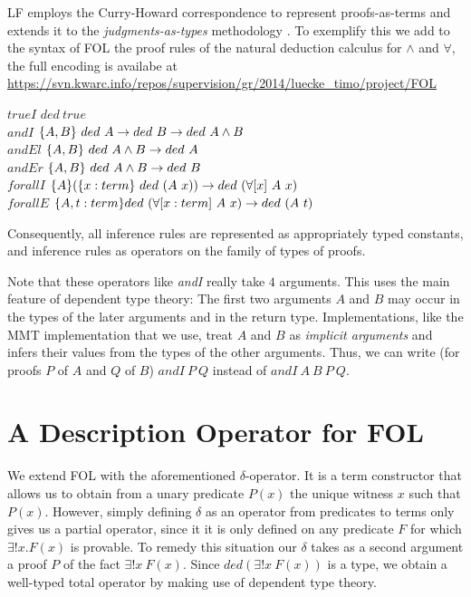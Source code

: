 \documentclass{article}
\begin{document}
LF employs the Curry-Howard correspondence to represent proofs-as-terms \cite{curryhoward} and extends it to the  \emph{judgments-as-types} methodology \cite{martinlof}. 
To exemplify this we add to the syntax of FOL the proof rules of the natural deduction calculus for $\wedge$ and $\forall$, the full encoding is availabe at \url{https://svn.kwarc.info/repos/supervision/gr/2014/luecke_timo/project/FOL}%
\begin{twelfsig}
$trueI$ \tcolon $ded\ true$ \\
$andI$ \tcolon $\{A,B\}\  ded\ A\rightarrow ded\ B \rightarrow ded\ A\wedge B$ \\
$andEl$ \tcolon $\{A,B\}\ ded\ A \wedge B \arr ded\ A$\\
$andEr$ \tcolon $\{A,B\}\ ded\ A \wedge B \arr ded\ B$\\
$forallI$ \tcolon $\{A\} (\{x: term\}\ ded\ (A\ x)) \arr ded\ (\forall [x]\ A\ x)$\\        
$forallE$ \tcolon  $\{A,t: term\} ded\ (\forall [x: term]\ A\ x) \rightarrow ded\ (A\ t)$\\ 
\end{twelfsig}

Consequently, all inference rules are represented as appropriately typed constants, and inference rules as operators on the family of types of proofs.

Note that these operators like \emph{andI} really take $4$ arguments. This uses the main feature of dependent type theory: The first two arguments $A$ and $B$ may occur in the types of the later arguments and in the return type.
Implementations, like the MMT implementation \cite{mmt} that we use, treat $A$ and $B$ as \emph{implicit arguments} and infers their values from the types of the other arguments. Thus, we can write (for proofs $P$ of $A$ and $Q$ of $B$) $andI\ P\  Q$ instead of $andI\ A\ B\ P\ Q$.



\section{A Description Operator for FOL}
We extend FOL with the aforementioned $\delta$-operator. It is a term constructor that allows us to obtain from a unary predicate $P(x)$ the unique witness $x$ such that $P(x)$. However, simply defining $\delta$ as an operator from predicates to terms only gives us a partial operator, since it it is only defined on any predicate $F$ for which $\exists!x.F(x)$ is provable. To remedy this situation our $\delta$ takes as a second argument a proof $P$ of the fact $\exists! x\ F(x)$. Since $ ded (\exists! x\ F(x))$ is a type, we obtain a well-typed total operator by making use of dependent type theory.  
\end{document}

